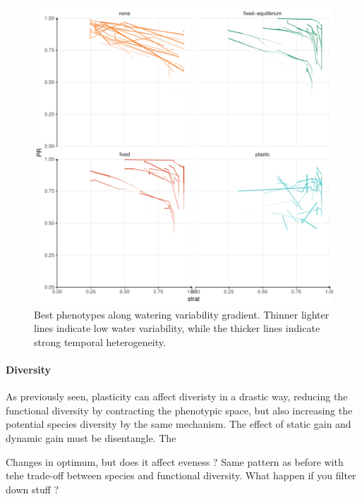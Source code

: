\begin{figure}\label{fig:variable_trajectories}
\includegraphics[width = \textwidth]{./2_PP/Figures/Variable/var_2D_strat_dyn.pdf}
\caption{Best phenotypes along watering variability gradient. Thinner lighter lines indicate low water variability, while the thicker lines indicate strong temporal heterogeneity.}
\end{figure}

\paragraph{Diversity}

As previously seen, plasticity can affect diveristy in a drastic way, reducing the functional diversity by contracting the phenotypic space, but also increasing the potential species diversity by the same mechanism. The effect of static gain and dynamic gain must be disentangle. The 



Changes in optimum, but does it affect eveness ? Same pattern as before with tehe trade-off between species and functional diversity. What happen if you filter down stuff ?



